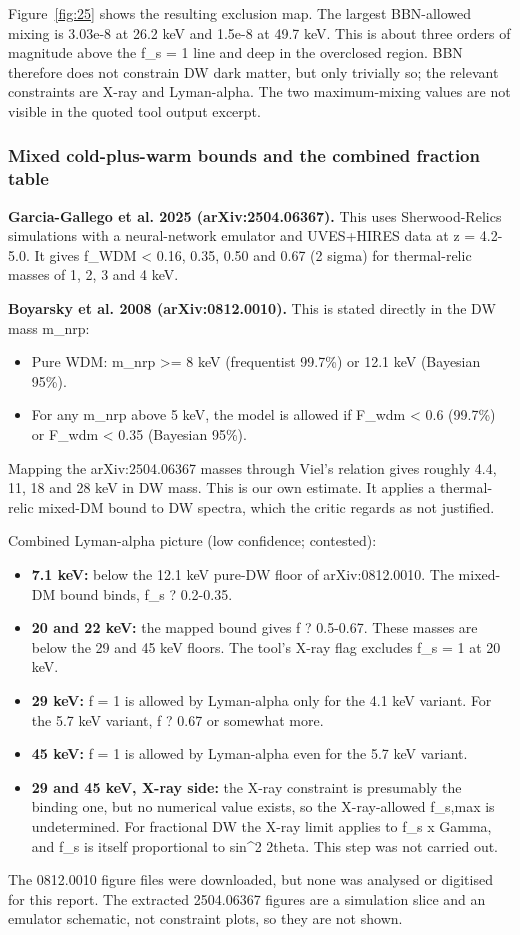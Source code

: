 \documentclass[11pt,a4paper]{article}
\begin{document}
Figure~\ref{fig:25} shows the resulting exclusion map. The largest BBN-allowed mixing is 3.03e-8 at 26.2 keV and 1.5e-8 at 49.7 keV. This is about three orders of magnitude above the f\_s = 1 line and deep in the overclosed region. BBN therefore does not constrain DW dark matter, but only trivially so; the relevant constraints are X-ray and Lyman-alpha. The two maximum-mixing values are not visible in the quoted tool output excerpt.

\subsubsection{Mixed cold-plus-warm bounds and the combined fraction table}
\textbf{Garcia-Gallego et al. 2025 (arXiv:2504.06367).} This uses Sherwood-Relics simulations with a neural-network emulator and UVES+HIRES data at z = 4.2-5.0. It gives f\_WDM \textless{} 0.16, 0.35, 0.50 and 0.67 (2 sigma) for thermal-relic masses of 1, 2, 3 and 4 keV.

\textbf{Boyarsky et al. 2008 (arXiv:0812.0010).} This is stated directly in the DW mass m\_nrp:

\begin{itemize}
  \item Pure WDM: m\_nrp \textgreater{}= 8 keV (frequentist 99.7\%) or 12.1 keV (Bayesian 95\%).
  \item For any m\_nrp above 5 keV, the model is allowed if F\_wdm \textless{} 0.6 (99.7\%) or F\_wdm \textless{} 0.35 (Bayesian 95\%).
\end{itemize}
Mapping the arXiv:2504.06367 masses through Viel's relation gives roughly 4.4, 11, 18 and 28 keV in DW mass. This is our own estimate. It applies a thermal-relic mixed-DM bound to DW spectra, which the critic regards as not justified.

Combined Lyman-alpha picture (low confidence; contested):

\begin{itemize}
  \item \textbf{7.1 keV:} below the 12.1 keV pure-DW floor of arXiv:0812.0010. The mixed-DM bound binds, f\_s ? 0.2-0.35.
  \item \textbf{20 and 22 keV:} the mapped bound gives f ? 0.5-0.67. These masses are below the 29 and 45 keV floors. The tool's X-ray flag excludes f\_s = 1 at 20 keV.
  \item \textbf{29 keV:} f = 1 is allowed by Lyman-alpha only for the 4.1 keV variant. For the 5.7 keV variant, f ? 0.67 or somewhat more.
  \item \textbf{45 keV:} f = 1 is allowed by Lyman-alpha even for the 5.7 keV variant.
  \item \textbf{29 and 45 keV, X-ray side:} the X-ray constraint is presumably the binding one, but no numerical value exists, so the X-ray-allowed f\_s,max is undetermined. For fractional DW the X-ray limit applies to f\_s x Gamma, and f\_s is itself proportional to sin\textasciicircum{}2 2theta. This step was not carried out.
\end{itemize}
The 0812.0010 figure files were downloaded, but none was analysed or digitised for this report. The extracted 2504.06367 figures are a simulation slice and an emulator schematic, not constraint plots, so they are not shown.
\end{document}
